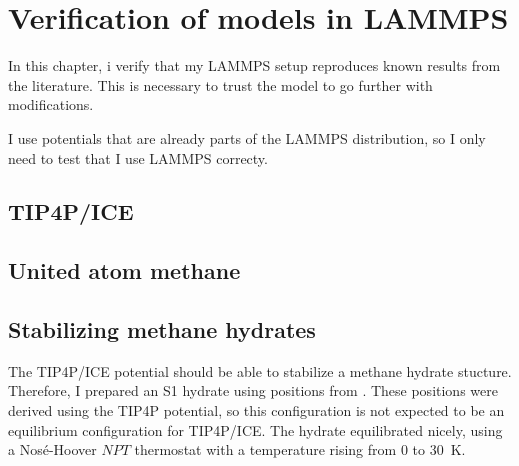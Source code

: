 \chapter{Verification of models in LAMMPS}
In this chapter, i verify that my LAMMPS setup reproduces known results from the literature. This is necessary to trust the model to go further with modifications.

I use potentials that are already parts of the LAMMPS distribution, so I only need to test that I use LAMMPS correcty. 

\section{TIP4P/ICE}
\section{United atom methane}
\section{Stabilizing methane hydrates}
The TIP4P/ICE potential should be able to stabilize a methane hydrate stucture. Therefore, I prepared an S1 hydrate using positions from \cite{Takeuchi2013}. These positions were derived using the TIP4P potential, so this configuration is not expected to be an equilibrium configuration for TIP4P/ICE. The hydrate equilibrated nicely, using a Nosé-Hoover $NPT$ thermostat with a temperature rising from $0$ to \SI{30}{\kelvin}. 

